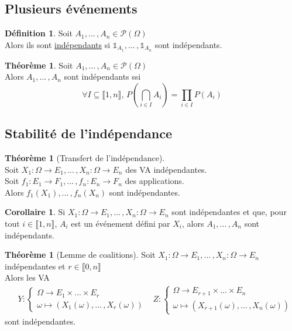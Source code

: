 \documentclass[10pt,a4paper]{article}
\theoremstyle{definition}
\newtheorem{theorem}[proposition]{Théorème}
\newtheorem{corollaire}[proposition]{Corollaire}
\newtheorem{definition}[proposition]{Définition}
\begin{document}
\subsection{Plusieurs événements}
\begin{definition}
Soit $A_1, ...\,, A_n \in \mathcal{P}(\Omega)$ \\
Alors ils sont \uline{indépendants} si $\mathds{1}_{A_1}, ...\,, \mathds{1}_{A_n}$ sont indépendants.
\end{definition}
\begin{theorem}
Soit $A_1, ...\,, A_n \in \mathcal{P}(\Omega)$ \\
Alors $A_1, ...\,, A_n$ sont indépendants ssi
\[\forall I \subseteq \llbracket 1, n \rrbracket,\, P\left( \bigcap\limits_{i \in I} A_i \right) = \prod\limits_{i \in I} P(A_i)\]
\end{theorem}

\subsection{Stabilité de l'indépendance}
\begin{theorem}[Transfert de l'indépendance]
\hfill \\
Soit $X_1: \Omega \to E_1, ...\,, X_n: \Omega \to E_n$ des VA indépendantes. \\
Soit $f_1: E_1 \to F_1, ...\,, f_n: E_n \to F_n$ des applications. \\
Alors $f_1(X_1), ...\,, f_n(X_n)$ sont indépendantes.
\end{theorem}
\begin{corollaire}
Si $X_1: \Omega \to E_1, ...\,, X_n: \Omega \to E_n$ sont indépendantes et que, pour tout $i \in \llbracket 1, n \rrbracket$, $A_i$ est un événement défini par $X_i$, alors $A_1, ...\,, A_n$ sont indépendants.
\end{corollaire}
\begin{theorem}[Lemme de coalitions]
Soit $X_1: \Omega \to E_1, ...\,, X_n: \Omega \to E_n$ indépendantes et $r \in \llbracket 0, n \rrbracket$ \\
Alors les VA
\begin{align*}&Y: \begin{cases}
\Omega \to E_1 \times ... \times E_r \\
\omega \mapsto (X_1(\omega), ...\,, X_r(\omega))
\end{cases} 
&Z: \begin{cases}
\Omega \to E_{r + 1} \times ... \times E_n \\
\omega \mapsto (X_{r + 1}(\omega), ...\,, X_n(\omega))
\end{cases}
\end{align*}
sont indépendantes.
\end{theorem}
\end{document}
